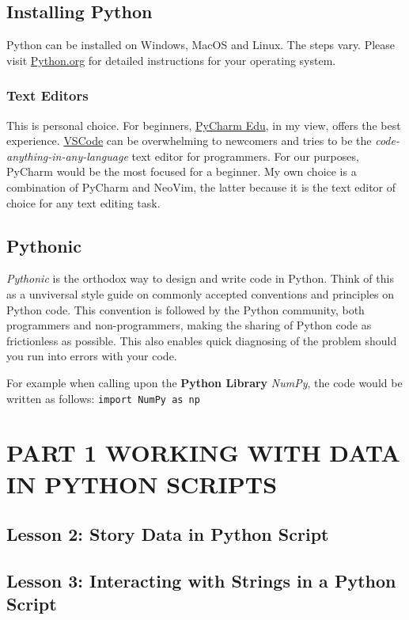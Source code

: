 \documentclass[11pt]{article}
\begin{document}
\subsection{Installing Python}
\label{sec:org688c55c}
Python can be installed on Windows, MacOS and Linux. The steps vary. Please visit \href{https://www.python.org/}{Python.org} for detailed instructions for your operating system.
\subsubsection{Text Editors}
\label{sec:org0baf76a}
This is personal choice. For beginners, \href{https://www.jetbrains.com/pycharm-edu/}{PyCharm Edu}, in my view, offers the best experience. \href{https://code.visualstudio.com/}{VSCode} can be overwhelming to newcomers and tries to be the \emph{code-anything-in-any-language} text editor for programmers. For our purposes, PyCharm would be the most focused for a beginner. My own choice is a combination of PyCharm and NeoVim, the latter because it is the text editor of choice for any text editing task.

\subsection{Pythonic}
\label{sec:org83bdf34}
\emph{Pythonic} is the orthodox way to design and write code in Python. Think of this as a unviversal style guide on commonly accepted conventions and principles on Python code. This convention is followed by the Python community, both programmers and non-programmers, making the sharing of Python code as frictionless as possible. This also enables quick diagnosing of the problem should you run into errors with your code.

For example when calling upon the \textbf{Python Library} \emph{NumPy}, the code would be written as follows: \texttt{import NumPy as np}

\section{PART 1 WORKING WITH DATA IN PYTHON SCRIPTS}
\label{sec:org13c4e53}
\subsection{Lesson 2: Story Data in Python Script}
\label{sec:orge218247}
\subsection{Lesson 3: Interacting with Strings in a Python Script}
\label{sec:org1aae5ba}
\end{document}
